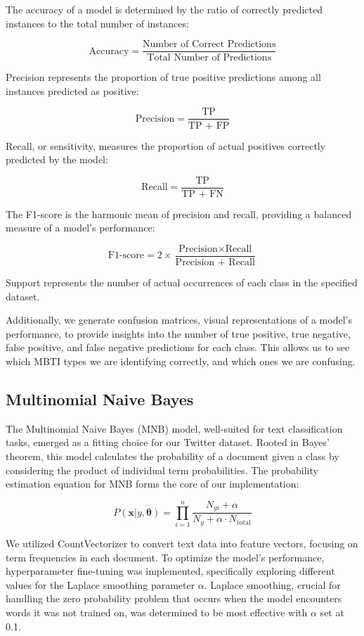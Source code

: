 \documentclass[twoside,11pt]{article}
\begin{document}
The accuracy of a model is determined by the ratio of correctly predicted instances to the total number of instances:

\[
\text{Accuracy} = \frac{\text{Number of Correct Predictions}}{\text{Total Number of Predictions}}
\]

Precision represents the proportion of true positive predictions among all instances predicted as positive:

\[
\text{Precision} = \frac{\text{TP}}{\text{TP + FP}}
\]

Recall, or sensitivity, measures the proportion of actual positives correctly predicted by the model:

\[
\text{Recall} = \frac{\text{TP}}{\text{TP + FN}}
\]

The F1-score is the harmonic mean of precision and recall, providing a balanced measure of a model's performance:

\[
\text{F1-score} = 2 \times \frac{\text{Precision} \times \text{Recall}}{\text{Precision + Recall}}
\]

Support represents the number of actual occurrences of each class in the specified dataset.

Additionally, we generate confusion matrices, visual representations of a model's performance, to provide insights into the number of true positive, true negative, false positive, and false negative predictions for each class. This allows us to see which MBTI types we are identifying correctly, and which ones we are confusing.

\subsection{Multinomial Naive Bayes}
The Multinomial Naive Bayes (MNB) model, well-suited for text classification tasks, emerged as a fitting choice for our Twitter dataset. Rooted in Bayes' theorem, this model calculates the probability of a document given a class by considering the product of individual term probabilities. The probability estimation equation for MNB forms the core of our implementation:

\[ P(\textbf{x}|y, \boldsymbol{\theta}) = \prod_{i=1}^{n} \frac{N_{yi} + \alpha}{N_{y} + \alpha \cdot N_{\text{total}}} \]

We utilized CountVectorizer to convert text data into feature vectors, focusing on term frequencies in each document. To optimize the model's performance, hyperparameter fine-tuning was implemented, specifically exploring different values for the Laplace smoothing parameter \(\alpha\). Laplace smoothing, crucial for handling the zero probability problem that occurs when the model encounters words it was not trained on, was determined to be most effective with \(\alpha\) set at 0.1.
\end{document}
